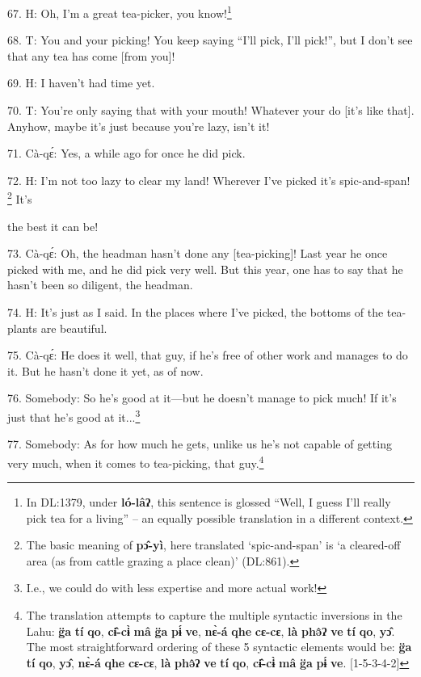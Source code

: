 67. H: Oh, I'm a great tea-picker, you know!\footnote{In DL:1379, under \textbf{ló-lâʔ}, this sentence is glossed ``Well, I guess I'll really pick tea for a living'' -- an equally possible translation in a different context.}

68. T: You and your picking! You keep saying ``I'll pick, I'll pick!'', but I
don't see that any tea has come [from you]!

69. H: I haven't had time yet.

70. T: You're only saying that with your mouth! Whatever your do [it's like that].
Anyhow, maybe it's just because you're lazy, isn't it!

71. Cà-qɛ́: Yes, a while ago for once he did pick.

72. H: I'm not too lazy to clear my land! Wherever I've picked it's spic-and-span!
\footnote{The basic meaning of \textbf{pɔ̂-yì}, here translated `spic-and-span' is `a cleared-off area (as from cattle grazing a place clean)' (DL:861).} It's

the best it can be!

73. Cà-qɛ́: Oh, the headman hasn't done any [tea-picking]! Last year he once
picked with me, and he did pick very well. But this year, one has to say that
he hasn't been so diligent, the headman.

74. H: It's just as I said. In the places where I've picked, the bottoms
of the tea-plants are beautiful.

75. Cà-qɛ́: He does it well, that guy, if he's free of other work and manages
to do it. But he hasn't done it yet, as of now.

76. Somebody: So he's good at it---but he doesn't manage to pick much! If it's
just that he's good at it...\footnote{I.e., we could do with less expertise and more actual work!}

77. Somebody: As for how much he gets, unlike us he's not capable of getting very
much, when it comes to tea-picking, that guy.\footnote{The translation attempts to capture the multiple syntactic inversions in the Lahu: \textbf{g̈a} \textbf{tí} \textbf{qo}, \textbf{cɨ̂-cɨ̀} \textbf{mâ} \textbf{g̈a} \textbf{pɨ́} \textbf{ve}, \textbf{nɛ̀-á} \textbf{qhe} \textbf{cɛ-cɛ}, \textbf{là} \textbf{phə̂ʔ} \textbf{ve} \textbf{tí} \textbf{qo}, \textbf{yɔ̂}. The most straightforward ordering of these 5 syntactic elements would be: \textbf{g̈a} \textbf{tí} \textbf{qo}, \textbf{yɔ̂}, \textbf{nɛ̀-á} \textbf{qhe} \textbf{cɛ-cɛ}, \textbf{là} \textbf{phə̂ʔ} \textbf{ve} \textbf{tí} \textbf{qo}, \textbf{cɨ̂-cɨ̀} \textbf{mâ} \textbf{g̈a} \textbf{pɨ́} \textbf{ve}. [1-5-3-4-2]}

